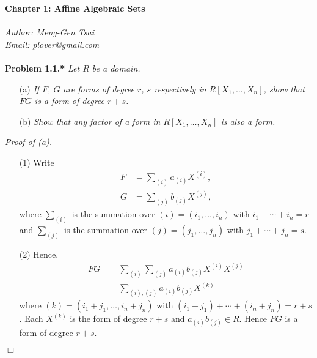 \documentclass{article}
\begin{document}
\textbf{\Large Chapter 1: Affine Algebraic Sets} \\\\



\emph{Author: Meng-Gen Tsai} \\
\emph{Email: plover@gmail.com} \\\\






\textbf{Problem 1.1.*}
\emph{Let $R$ be a domain.}
\begin{enumerate}
\item[(a)]
  \emph{If $F$, $G$ are forms of degree $r$, $s$ respectively in $R[X_1,\ldots,X_n]$,
  show that $FG$ is a form of degree $r+s$.}

\item[(b)]
  \emph{Show that any factor of a form in $R[X_1,\ldots,X_n]$ is also a form. } \\
\end{enumerate}

\emph{Proof of (a).}
\begin{enumerate}
\item[(1)]
  Write
  \begin{align*}
    F &= \sum_{(i)} a_{(i)} X^{(i)}, \\
    G &= \sum_{(j)} b_{(j)} X^{(j)},
  \end{align*}
  where $\sum_{(i)}$ is the summation over $(i) = (i_1,\ldots,i_n)$ with $i_1+\cdots+i_n = r$
  and $\sum_{(j)}$ is the summation over $(j) = (j_1,\ldots,j_n)$ with $j_1+\cdots+j_n = s$.

\item[(2)]
  Hence,
  \begin{align*}
    FG
    &= \sum_{(i)} \sum_{(j)} a_{(i)}b_{(j)} X^{(i)}X^{(j)} \\
    &= \sum_{(i),(j)} a_{(i)}b_{(j)} X^{(k)}
  \end{align*}
  where $(k) = (i_1+j_1,\ldots,i_n+j_n)$ with $(i_1+j_1)+\cdots+(i_n+j_n) = r+s$.
  Each $X^{(k)}$ is the form of degree $r+s$ and $a_{(i)}b_{(j)} \in R$.
  Hence $FG$ is a form of degree $r+s$.
\end{enumerate}
$\Box$\\
\end{document}
